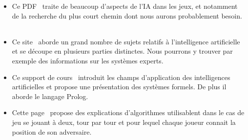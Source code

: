 \documentclass[12pt]{article}
\begin{document}
\begin{itemize}
		\item Ce PDF~\cite{ref9} traite de beaucoup d'aspects de l'IA dans les jeux, et notamment de la recherche du plus court chemin dont nous aurons probablement besoin.
		~~\\

		\item Ce site~\cite{ref10} aborde un grand nombre de sujets relatifs à l'intelligence artificielle et se découpe en plusieurs parties distinctes. Nous pourrons y trouver par exemple des informations sur les systèmes experts.
		~~\\

		\item Ce support de cours~\cite{ref11} introduit les champs d'application des intelligences artificielles et propose une présentation des systèmes formels. De plus il aborde le langage Prolog.
		~~\\

		\item Cette page~\cite{ref12} propose des explications d'algorithmes utilisablent dans le cas de jeu se jouant à deux, tour par tour et pour lequel chaque joueur connait la position de son adversaire.
		~~\\


	\end{itemize}
	
	
	{}
\end{document}
